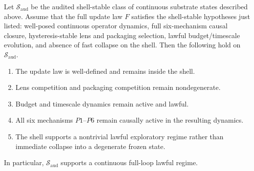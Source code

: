 \begin{theorem}\label{thm:lawfulness}
Let \(\mathcal{S}_{\mathrm{aud}}\) be the audited shell-stable class of continuous substrate states described above. Assume that the full update law \(F\) satisfies the shell-stable hypotheses just listed: well-posed continuous operator dynamics, full six-mechanism causal closure, hysteresis-stable lens and packaging selection, lawful budget/timescale evolution, and absence of fast collapse on the shell. Then the following hold on \(\mathcal{S}_{\mathrm{aud}}\).

\begin{enumerate}
    \item The update law is well-defined and remains inside the shell.
    \item Lens competition and packaging competition remain nondegenerate.
    \item Budget and timescale dynamics remain active and lawful.
    \item All six mechanisms \(P1\)--\(P6\) remain causally active in the resulting dynamics.
    \item The shell supports a nontrivial lawful exploratory regime rather than immediate collapse into a degenerate frozen state.
\end{enumerate}

In particular, \(\mathcal{S}_{\mathrm{aud}}\) supports a continuous full-loop lawful regime.
\end{theorem}

